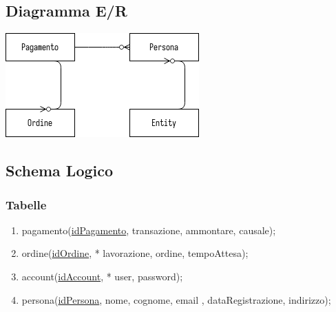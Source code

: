 \documentclass[hidelinks,  a4paper, 14pt]{report}
\begin{document}
\subsection{Diagramma E/R}
\begin{center}
\includegraphics[scale=0.5]{img/erCalzolaio.png}
\end{center}

\subsection{Schema Logico}
    \subsubsection{Tabelle}

        \begin{enumerate}
            \item pagamento(\underline{idPagamento}, transazione, ammontare, causale);
            \item ordine(\underline{idOrdine}, * lavorazione, ordine, tempoAttesa);
            \item account(\underline{idAccount}, * user, password);
            \item persona(\underline{idPersona}, nome, cognome, email , dataRegistrazione, indirizzo);
        \end{enumerate}
\newpage
\end{document}
